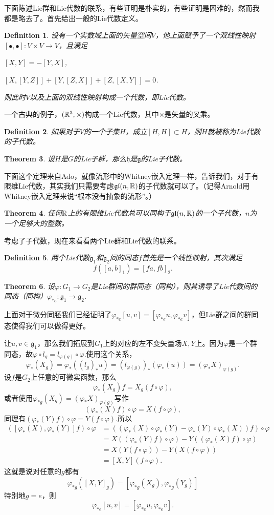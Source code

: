 \documentclass[9pt]{extbook}
\theoremstyle{plain}
\newtheorem{defi}{Definition}
\newtheorem{theo}[defi]{Theorem}
\newcommand{\lag}{{\mathfrak{g}}}  %
\begin{document}
下面陈述Lie群和Lie代数的联系，有些证明是朴实的，有些证明是困难的，然而我都是略去了。首先给出一般的Lie代数定义。
\begin{defi}
设有一个实数域上面的矢量空间$V$，他上面赋予了一个双线性映射$[\bullet,\bullet]:V\times V\to V$，且满足

 $[X,Y]=-[Y,X]$,

 $[X,[Y,Z]]+[Y,[Z,X]]+[Z,[X,Y]]=0$.

则此时$V$以及上面的双线性映射构成一个代数，即Lie代数。
\end{defi}

一个古典的例子，$(\mathbb{R}^3,\times)$构成一个Lie代数，其中$\times$是矢量的叉乘。

\begin{defi}
如果对于$V$的一个子集$H$，成立$[H,H]\subset H$，则$H$就被称为Lie代数的子代数。
\end{defi}
\begin{theo}
设$H$是$G$的Lie子群，那么$\mathfrak{h}$是$\lag$的Lie子代数。
\end{theo}
下面这个定理来自Ado，就像流形中的Whitney嵌入定理一样，告诉我们，对于有限维Lie代数，其实我们只需要考虑$\mathfrak{gl}(n,\mathbb{R})$的子代数就可以了。（记得Arnold用Whitney嵌入定理来说“根本没有抽象的流形”。）
\begin{theo}
任何$\mathbb{R}$上的有限维Lie代数总可以同构于$\mathfrak{gl}(n,\mathbb{R})$的一个子代数，$n$为一个足够大的整数。
\end{theo}

考虑了子代数，现在来看看两个Lie群和Lie代数的联系。
\begin{defi}
两个Lie代数$\lag_1$和$\lag_2$间的同态$f$首先是一个线性映射，其次满足
\[
f([a,b]_1)=[fa,fb]_2.
\]
\end{defi}
\begin{theo}
设$\varphi:G_1\to G_2$是Lie群间的群同态（同构），则其诱导了Lie代数间的同态（同构）$\varphi_{*e}:\lag_1\to \lag_2$.
\end{theo}
上面对于微分同胚我们已经证明了$\varphi_{*e}[u,v]=[\varphi_{*e}u,\varphi_{*e}v]$，但Lie群之间的群同态使得我们可以做得更好。

让$u,v\in\lag_1$，那么我们拓展到$G_1$上的对应的左不变矢量场$X,Y$上。因为$\varphi$是一个群同态，故$\varphi\circ l_g=l_{\varphi(g)}\circ \varphi$.使用这个关系，
\[
	\varphi_{*}(X_g)=\varphi_{*}((l_g)_*u)=(l_{\varphi(g)})_*(\varphi_{*}(u))=(\varphi_{*}X)_{\varphi(g)}.
\]
设$f$是$G_2$上任意的可微实函数，那么
\[
\varphi_{*}(X_g)f=X_g(f\circ \varphi),
\]
或者使用$\varphi_{*g}(X_g)=(\varphi_{*}X)_{\varphi(g)}$写作
\[
(\varphi_{*}(X)f)\circ \varphi=X(f\circ \varphi),
\]
同理有$(\varphi_{*}(Y)f)\circ \varphi=Y(f\circ \varphi)$.所以
\[
	\begin{split}
		([\varphi_*(X),\varphi_*(Y)]f)\circ \varphi&=((\varphi_*(X)\circ\varphi_*(Y)-\varphi_*(Y)\circ\varphi_*(X))f)\circ \varphi\\
		&=X((\varphi_*(Y)f)\circ \varphi)-Y((\varphi_*(X)f)\circ \varphi)\\
		&=X(Y(f\circ \varphi))-Y(X(f\circ \varphi))\\
		&=[X,Y](f\circ \varphi).
	\end{split}
\]
这就是说对任意的$g$都有
\[
	\varphi_{*g}([X,Y]_g)=[\varphi_{*g}(X_g),\varphi_{*g}(Y_g)]
\]
特别地$g=e$，则
\[
	\varphi_{*e}[u,v]=[\varphi_{*e}u,\varphi_{*e}v].
\]
\end{document}
